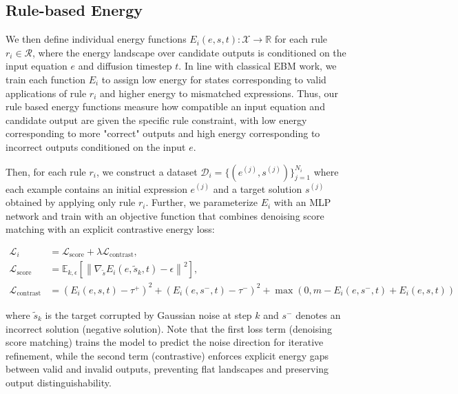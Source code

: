 \documentclass{article}
\begin{document}
\subsection{Rule-based Energy} %
\label{rule-based-energy}
We then define individual energy functions $E_i(e,s, t): \mathcal{X} \rightarrow \mathbb{R}$ for each rule $r_i \in \mathcal{R}$, where the energy landscape over candidate outputs is conditioned on the input equation $e$ and diffusion timestep $t$. In line with classical EBM work, we train each function $E_i$ to assign low energy for states corresponding to valid applications of rule $r_i$ and higher energy to mismatched expressions. Thus, our rule based energy functions measure how compatible an input equation and candidate output are given the specific rule constraint, with low energy corresponding to more "correct" outputs and high energy corresponding to incorrect outputs conditioned on the input $e$.

Then, for each rule $r_i$, we construct a dataset $\mathcal{D}_i = \{(e^{(j)}, s^{(j)})\}_{j=1}^{N_i}$ where each example contains an initial expression $e^{(j)}$ and a target solution $s^{(j)}$ obtained by applying only rule $r_i$. Further, we parameterize $E_i$ with an MLP network and train with an objective function that combines denoising score matching with an explicit contrastive energy loss:

\begin{align}
\mathcal{L}_i &= \mathcal{L}_{\text{score}} + \lambda \mathcal{L}_{\text{contrast}}, \\[4pt]
\mathcal{L}_{\text{score}} &=
\mathbb{E}_{k,\epsilon}\!\left[
\left\| \nabla_{\tilde{s}} E_i(e,\tilde{s}_k,t) - \epsilon \right\|^2
\right], \\[4pt]
\mathcal{L}_{\text{contrast}} &=
(E_i(e,s,t) - \tau^+)^2
+ (E_i(e,s^-,t) - \tau^-)^2
+ \max\!\left(0, m - E_i(e,s^-,t) + E_i(e,s,t)\right)
\end{align}

where $\tilde{s}_k$ is the target corrupted by Gaussian noise at step $k$ and $s^-$ denotes an incorrect solution (negative solution). Note that the first loss term (denoising score matching) trains the model to predict the noise direction for iterative refinement, while the second term (contrastive) enforces explicit energy gaps between valid and invalid outputs, preventing flat landscapes and preserving output distinguishability. %
\end{document}
